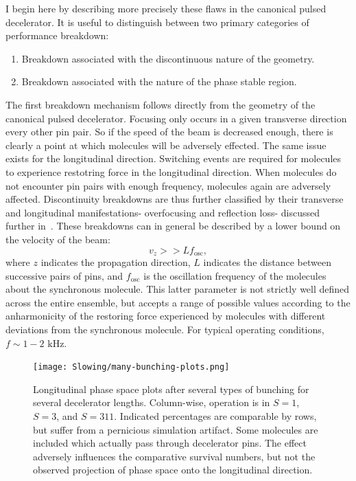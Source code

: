 I begin here by describing more precisely these flaws in the canonical pulsed decelerator.
It is useful to distinguish between two primary categories of performance breakdown:
\begin{enumerate}
\item Breakdown associated with the discontinuous nature of the geometry.
\item Breakdown associated with the nature of the phase stable region.
\end{enumerate}
The first breakdown mechanism follows directly from the geometry of the canonical pulsed decelerator. Focusing only occurs in a given transverse direction every other pin pair. So if the speed of the beam is decreased enough, there is clearly a point at which molecules will be adversely effected.
The same issue exists for the longitudinal direction. Switching events are required for molecules to experience restotring force in the longitudinal direction. When molecules do not encounter pin pairs with enough frequency, molecules again are adversely affected.
Discontinuity breakdowns are thus further classified by their transverse and longitudinal manifestations- overfocusing and reflection loss- discussed further in~\cite{Sawyer2008a}.
These breakdowns can in general be described by a lower bound on the velocity of the beam:
\begin{equation}
v_z >> Lf_\text{osc} \label{breakdownequation},
\end{equation}
where $z$ indicates the propagation direction, $L$ indicates the distance between successive pairs of pins, and $f_\text{osc}$ is the oscillation frequency of the molecules about the synchronous molecule.
This latter parameter is not strictly well defined across the entire ensemble, but accepts a range of possible values according to the anharmonicity of the restoring force experienced by molecules with different deviations from the synchronous molecule.
For typical operating conditions, $f\sim 1-2\text{ kHz}$.

\begin{figure}[t!]
\centering
\label{bunchingphasespace311}
\texttt{[image: Slowing/many-bunching-plots.png]}%
\caption{
Longitudinal phase space plots after several types of bunching for several decelerator lengths. Column-wise, operation is in $S=1$, $S=3$, and $S=311$. Indicated percentages are comparable by rows, but suffer from a pernicious simulation artifact. Some molecules are included which actually pass through decelerator pins. The effect adversely influences the comparative survival numbers, but not the observed projection of phase space onto the longitudinal direction.
}
\end{figure}

